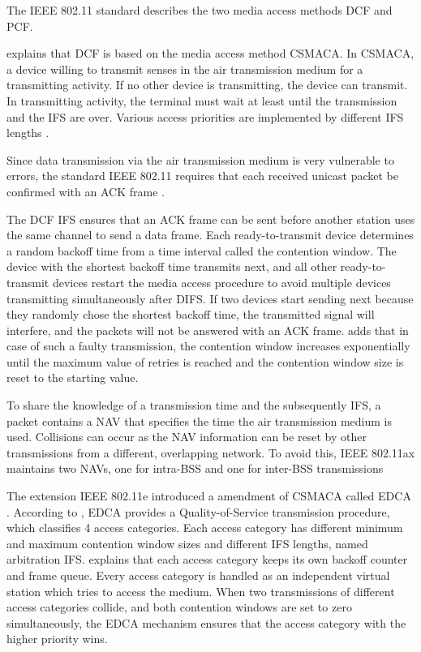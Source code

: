 The IEEE 802.11 standard describes the two media access methods \ac{DCF} and \ac{PCF}.

\textcite{sauter_wireless_2022} explains that \ac{DCF} is based on the media access method \ac{CSMACA}.
In \ac{CSMACA}, a device willing to transmit senses in the air transmission medium for a transmitting activity.
If no other device is transmitting, the device can transmit.
In transmitting activity, the terminal must wait at least until the transmission and the \ac{IFS} are over.
Various access priorities are implemented by different \ac{IFS} lengths \cite{sommer_vehicular_2014}.

Since data transmission via the air transmission medium is very vulnerable to errors,
the standard IEEE 802.11 requires that each received unicast packet be confirmed with an \ac{ACK} frame \cite{sommer_vehicular_2014}.

The \ac{DCF} \ac{IFS} ensures that an \ac{ACK} frame can be sent before another station uses the same channel to send a data frame.
Each ready-to-transmit device determines
a random backoff time from a time interval called the contention window.
The device with the shortest backoff time transmits next, and all other ready-to-transmit devices restart the media access procedure to avoid multiple devices transmitting simultaneously after \ac{DIFS}.
If two devices start sending next because they randomly chose the shortest backoff time,
the transmitted signal will interfere, and the packets will not be answered with an \ac{ACK} frame.
\textcite{sommer_vehicular_2014} adds that in case of such a faulty transmission, the contention window increases exponentially until the maximum value of retries is reached and
the contention window size is reset to the starting value.

To share the knowledge of a transmission time and the subsequently \ac{IFS}, a packet contains a \ac{NAV} that
specifies the time the air transmission medium is used.
Collisions can occur as the \ac{NAV} information can be reset by other transmissions from a different, overlapping network.
To avoid this, IEEE 802.11ax maintains two \ac{NAV}s, one for intra-\ac{BSS} and one for inter-\ac{BSS} transmissions \cite{ieee_standard_2021ax}

The extension IEEE 802.11e introduced a amendment of \ac{CSMACA} called \ac{EDCA} \cite{sommer_vehicular_2014} \cite{wu_ieee_2006}.
According to \textcite{sommer_vehicular_2014}, \ac{EDCA} provides a Quality-of-Service transmission procedure, which classifies \num{4} access categories.
Each access category has different minimum and maximum contention window sizes and different \ac{IFS} lengths, named
arbitration \ac{IFS}.
\textcite{wu_ieee_2006} explains that each access category keeps its own backoff counter and frame queue.
Every access category is handled as an independent virtual station which tries to access the medium.
When two transmissions of different access categories collide, and both contention windows are set to zero simultaneously, the \ac{EDCA} mechanism ensures that the access category with the higher priority wins.

